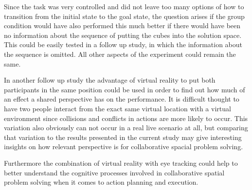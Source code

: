 Since the task was very controlled and did not leave too many options of how to transition from the initial state to the goal state, the question arises if the group condition would have also performed this much better if there would have been no information about the sequence of putting the cubes into the solution space. This could be easily tested in a follow up study, in which the information about the sequence is omitted. All other aspects of the experiment could remain the same.

In another follow up study the advantage of virtual reality to put both participants in the same position could be used in order to find out how much of an effect a shared perspective has on the performance. It is difficult thought to have two people interact from the exact same virtual location with a virtual environment since collisions and conflicts in actions are more likely to occur. This variation also obviously can not occur in a real live scenario at all, but comparing that variation to the results presented in the current study may give interesting insights on how relevant perspective is for collaborative spacial problem solving.

Furthermore the combination of virtual reality with eye tracking could help to better understand the cognitive processes involved in collaborative spatial problem solving when it comes to action planning and execution. 